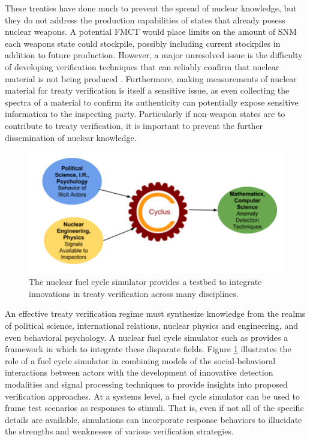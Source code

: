 These treaties have done much to prevent the spread of nuclear knowledge, but they do not address the production capabilities of states that already posess nuclear weapons.
A potential \gls{FMCT} would place limits on the amount of \gls{SNM} each weapons state could stockpile, possibly including current stockpiles in addition to future production.
However, a major unresolved issue is the difficulty of developing verification techniques that can reliably confirm that nuclear material is not being produced \cite{_fissile_2013}.  Furthermore, making measurements of nuclear material for treaty verification is itself a sensitive issue, as even collecting the spectra of a material to confirm its authenticity can potentially expose sensitive information to the inspecting party\cite{glaser_zero-knowledge_2014}. Particularly if non-weapon states are to contribute to treaty verification, it is important to prevent the further dissemination of nuclear knowledge.

\begin{figure}%
\begin{center}
\includegraphics[natwidth=162bp,natheight=227bp, scale=0.5]{./figs/cyclus_interdiscipline.png}
\end{center}
\caption{The \Cyclus nuclear fuel cycle simulator provides a testbed to integrate innovations in treaty verification across many disciplines.}
\label{fig:cyclus_diagram}
\end{figure}

An effective treaty verification regime must synthesize knowledge from the realms of political science, international relations, nuclear physics and engineering, and even behavioral psychology.  A nuclear fuel cycle simulator such as \Cyclus provides a framework in which to integrate these disparate fields.  Figure \ref{fig:cyclus_diagram} illustrates  the role of a fuel cycle simulator in combining models of the social-behavioral interactions between actors with the development of innovative detection modalities and signal processing techniques to provide insights into proposed verification approaches.  At a systems level, a fuel cycle simulator can be used to frame test scenarios as responses to stimuli. That is, even if not all of the specific details are available, simulations can incorporate response behaviors to illucidate the strengths and weaknesses of various verification strategies.


